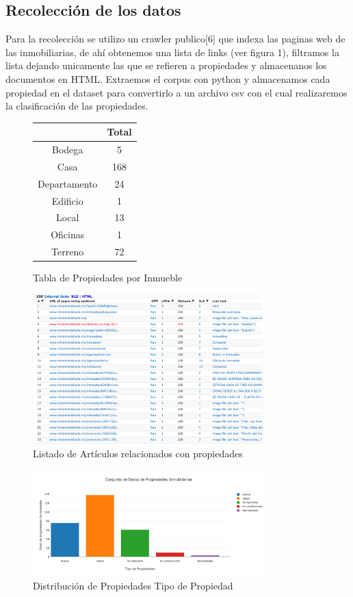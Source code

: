 \subsection{Recolección de los datos}

Para la recolección se  utilizo un crawler publico{[}6{]} que indexa las paginas web de las inmobiliarias, de ahí obtenemos una lista de links (ver figura 1), filtramos la lista dejando unicamente las que se refieren a propiedades y almacenanos los documentos en HTML. Extraemos el corpus con python y almacenamos cada propiedad en el dataset para convertirlo a un archivo csv con el cual realizaremos la clasificación de las propiedades.
\begin{figure}[h]
\centering
\begin{tabular}{cc}
  \hline
 & Total \\ 
  \hline
Bodega &   5 \\ 
  Casa & 168 \\ 
  Departamento &  24 \\ 
  Edificio &   1 \\ 
  Local &  13 \\ 
  Oficinas &   1 \\ 
  Terreno &  72 \\ 
   \hline
\end{tabular}
\caption{Tabla de Propiedades por Inmueble}
\end{figure}


\begin{figure}[htbp]
\centering
\includegraphics[width=0.8\textwidth]{CrawlerSite.png}
\caption{Listado de Artículos relacionados con propiedades}
\end{figure}

\begin{figure}[htbp]
\centering
\includegraphics[width=0.8\textwidth]{PropiedadesInmobiliariasEstadoVivienda.png}
\caption{Distribución de Propiedades Tipo de Propiedad}
\end{figure}

